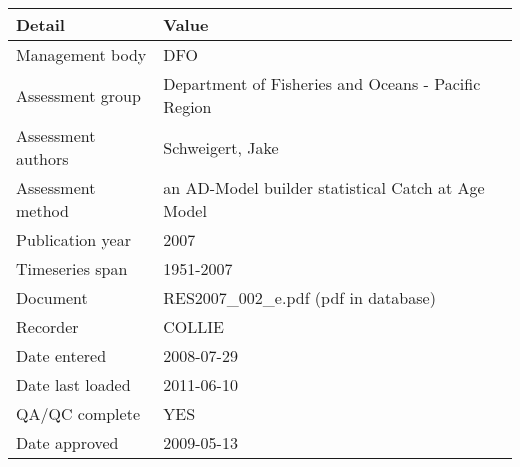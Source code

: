 \begin{table}[htb]
\centering
\begin{tabular}{lp{7cm}}
\toprule
Detail & Value \\
\midrule
Management body    & DFO                                                 \\
Assessment group   & Department of Fisheries and Oceans - Pacific Region \\
Assessment authors & Schweigert, Jake                                    \\
Assessment method  & an AD-Model builder statistical Catch at Age Model  \\
Publication year   & 2007                                                \\
Timeseries span    & 1951-2007                                           \\
Document           & RES2007\_002\_e.pdf (pdf in database)               \\
Recorder           & COLLIE                                              \\
Date entered       & 2008-07-29                                          \\
Date last loaded   & 2011-06-10                                          \\
QA/QC complete     & YES                                                 \\
Date approved      & 2009-05-13                                          \\
\bottomrule
\end{tabular}
\label{tab:assessdet}
\end{table}
